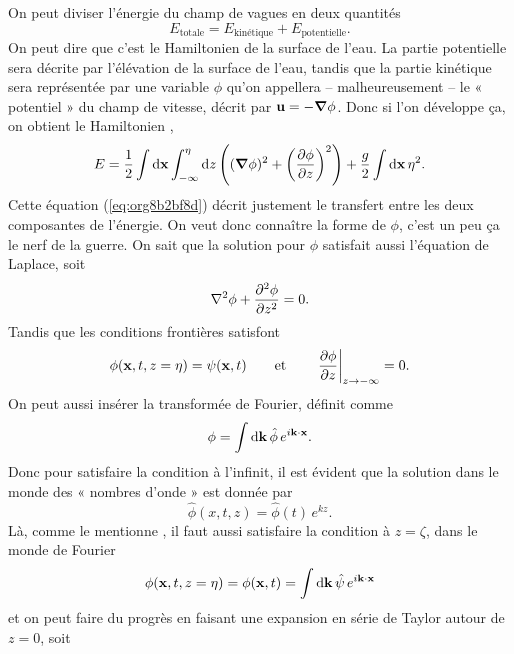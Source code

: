 \documentclass[10pt]{article}
\numberwithin{equation}{section}
\newcommand{\xx}{\vb{x}}
\begin{document}
On peut diviser l'énergie du champ de vagues en deux quantités \autocite{Hasselmann_1962}
\begin{equation}
   E_\text{totale} = E_\text{kinétique} + E_\text{potentielle}.
\end{equation}
On peut dire que c'est le Hamiltonien de la surface de l'eau.
La partie potentielle sera décrite par l'élévation de la surface de l'eau, tandis que la partie kinétique sera représentée par une variable \(\phi\) qu'on appellera -- malheureusement -- le « potentiel » du champ de vitesse, décrit par \(\vb{u} = -\gradient{\phi}\).
Donc si l'on développe ça, on obtient le Hamiltonien \autocite{Janssen2004chap4},
\begin{equation}
\label{eq:org8b2bf8d}
   E = \frac{1}{2} \int\dd \xx \int_{-\infty}^\eta\dd z\, \qty( (\gradient{\phi})^2 + \qty(\pdv{\phi}{z})^2 ) + \frac{g}{2} \int \dd\xx\, \eta^2.
\end{equation}
Cette équation  (\ref{eq:org8b2bf8d}) décrit justement le transfert entre les deux composantes de l'énergie.
On veut donc connaître la forme de \(\phi\), c'est un peu ça le nerf de la guerre.
On sait que la solution pour \(\phi\) satisfait aussi l'équation de Laplace, soit
\begin{equation}
   \laplacian{\phi} + \pdv[2]{\phi}{z} = 0.
\end{equation}
Tandis que les conditions frontières satisfont 
\begin{equation}
    \phi(\xx, t, z = \eta) = \psi(\xx,t)  \qquad \text{et} \qquad \eval{\pdv{\phi}{z}}_{z\rightarrow-\infty} = 0.
\end{equation}
On peut aussi insérer la transformée de Fourier, définit comme
\begin{equation}
   \phi = \int\dd\vb{k}\, \hat{\phi}\, e^{i\vb{k}\cdot\xx}.
\end{equation}
Donc pour satisfaire la condition à l'infinit, il est évident que la solution dans le monde des « nombres d'onde »  est donnée par
\begin{equation}
\label{eq:org8e93cf6}
   \hat{\phi}(x, t, z) =  \hat{\phi}(t)\,e^{kz}.
\end{equation}
Là, comme le mentionne \Textcite{Janssen2004chap4}, il faut aussi satisfaire la condition à \(z=\zeta\), dans le monde de Fourier
\begin{equation}
   \phi(\xx,t,z = \eta) = \phi(\xx,t) = \int\dd\vb{k}\, \hat{\psi}\, e^{i\vb{k}\cdot\xx}
\end{equation}
et on peut faire du progrès en faisant une expansion en série de Taylor autour de \(z = 0\), soit
\end{document}
